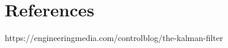 \documentclass{article}
\begin{document}
\section{References}

https://engineeringmedia.com/controlblog/the-kalman-filter
\end{document}
